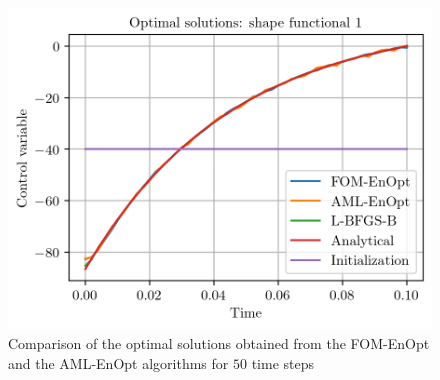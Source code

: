 \begin{figure}
\centering
\includegraphics{Plots/solutionsNT50.png}
\caption{\label{solutionsNT50Plot}Comparison of the optimal solutions obtained from the FOM-EnOpt and the AML-EnOpt algorithms for $50$ time steps}
\end{figure}

